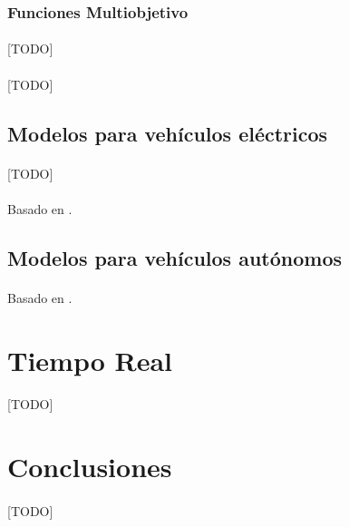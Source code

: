 \documentclass{subfiles}
\begin{document}
        \subsubsection{Funciones Multiobjetivo}
        \label{sec:formulation_extensions_objective_functions_multi}

          \paragraph{}
          [TODO]

        \paragraph{}
        [TODO]

      \subsection{Modelos para vehículos eléctricos}
      \label{sec:formulation_extensions_electric}

        \paragraph{}
        [TODO]

        \paragraph{}
        Basado en \cite{erdougan2012green}.

      \subsection{Modelos para vehículos autónomos}
      \label{sec:formulation_extensions_autonomous}

        \paragraph{}
        Basado en \cite{dial1995autonomous,bongiovanni2019electric}.



    \section{Tiempo Real}
    \label{sec:formulation_real_time}

      \paragraph{}
      [TODO]

    \section{Conclusiones}
    \label{sec:formulation_conclusions}

      \paragraph{}
      [TODO]
\end{document}
